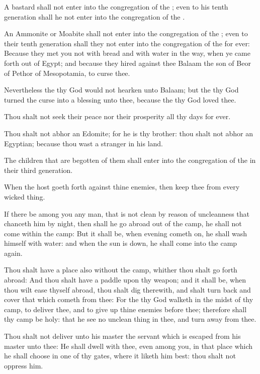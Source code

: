 \verse A bastard shall not enter into the congregation of the \LORD; even to his tenth generation shall he not enter into the congregation of the \LORD.

\verse An Ammonite or Moabite shall not enter into the congregation of the \LORD; even to their tenth generation shall they not enter into the congregation of the \LORD for ever: \verse Because they met you not with bread and with water in the way, when ye came forth out of Egypt; and because they hired against thee Balaam the son of Beor of Pethor of Mesopotamia, to curse thee.

\verse Nevertheless the \LORD thy God would not hearken unto Balaam; but the \LORD thy God turned the curse into a blessing unto thee, because the \LORD thy God loved thee.

\verse Thou shalt not seek their peace nor their prosperity all thy days for ever.

\verse Thou shalt not abhor an Edomite; for he is thy brother: thou shalt not abhor an Egyptian; because thou wast a stranger in his land.

\verse The children that are begotten of them shall enter into the congregation of the \LORD in their third generation.

\verse When the host goeth forth against thine enemies, then keep thee from every wicked thing.

\verse If there be among you any man, that is not clean by reason of uncleanness that chanceth him by night, then shall he go abroad out of the camp, he shall not come within the camp: \verse But it shall be, when evening cometh on, he shall wash himself with water: and when the sun is down, he shall come into the camp again.

\verse Thou shalt have a place also without the camp, whither thou shalt go forth abroad: \verse And thou shalt have a paddle upon thy weapon; and it shall be, when thou wilt ease thyself abroad, thou shalt dig therewith, and shalt turn back and cover that which cometh from thee: \verse For the \LORD thy God walketh in the midst of thy camp, to deliver thee, and to give up thine enemies before thee; therefore shall thy camp be holy: that he see no unclean thing in thee, and turn away from thee.

\verse Thou shalt not deliver unto his master the servant which is escaped from his master unto thee: \verse He shall dwell with thee, even among you, in that place which he shall choose in one of thy gates, where it liketh him best: thou shalt not oppress him.

